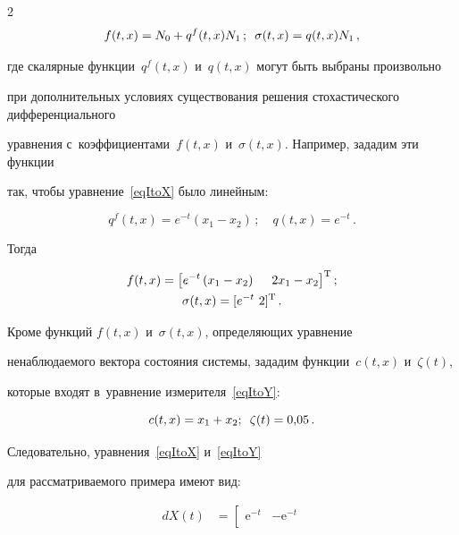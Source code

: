 \begin{multicols}{2}
$$

  f(t,x) = N_0 + q^f(t,x) N_1\,;\enskip \sigma(t,x) = q(t,x) N_1\,,

$$

где скалярные функции~$q^f(t,x)$ и~$q(t,x)$ могут быть выбраны произвольно 

при дополнительных условиях существования решения стохастического дифференциального 

уравнения с~коэффициентами~$f(t,x)$ и~$\sigma(t,x)$. Например, зададим эти функции 

так, чтобы уравнение~\eqref{eqItoX} было линейным: 

$$

q^f(t,x) = {e}^{-t} 

\left(x_1 - x_2\right)\,;\quad 

q(t,x) = {e}^{-t}\,.

$$

 Тогда

\begin{gather*}

  f(t,x) = \left[  {e}^{-t} \left(x_1 - x_2\right) \  \ \ \ 2 x_1 - x_2 

   \right]^\trans;\\

   \sigma(t,x) = [  {e}^{-t} \  2  ]^\trans\,.

\end{gather*}



Кроме функций $f(t,x)$ и~$\sigma(t,x)$, определяющих уравнение

 ненаблюдаемого вектора состояния сис\-те\-мы, зададим функции~$c(t,x)$ и~$\zeta(t)$, 

 которые входят в~уравнение измерителя~\eqref{eqItoY}:

$$

  c(t,x) = x_1 + x_2; \enskip \zeta(t) = 0{,}05\,.

$$



Следовательно, уравнения~\eqref{eqItoX} и~\eqref{eqItoY} 

для рас\-смат\-ри\-ва\-емо\-го примера имеют вид:

\begin{align*}

  dX(t) &= \left[ \begin{array}{cc}

    \mathrm{e}^{-t} & -\mathrm{e}^{-t} \\


\end{array}
\end{align*}
\end{multicols}
